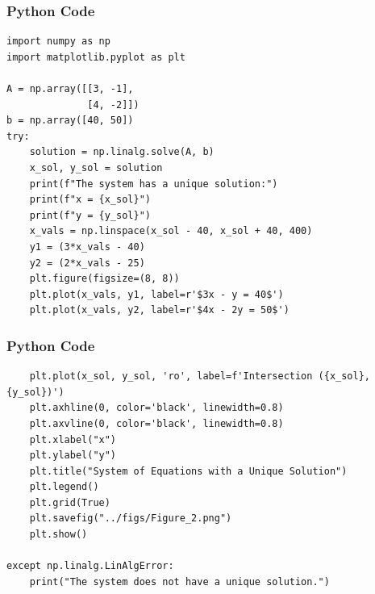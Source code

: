\documentclass{beamer}
\begin{document}
\begin{frame}[fragile]
    \frametitle{Python Code}
    \begin{lstlisting}
import numpy as np
import matplotlib.pyplot as plt

A = np.array([[3, -1],
              [4, -2]])
b = np.array([40, 50])
try:
    solution = np.linalg.solve(A, b)
    x_sol, y_sol = solution
    print(f"The system has a unique solution:")
    print(f"x = {x_sol}")
    print(f"y = {y_sol}")
    x_vals = np.linspace(x_sol - 40, x_sol + 40, 400)
    y1 = (3*x_vals - 40)
    y2 = (2*x_vals - 25)
    plt.figure(figsize=(8, 8))
    plt.plot(x_vals, y1, label=r'$3x - y = 40$')
    plt.plot(x_vals, y2, label=r'$4x - 2y = 50$')
    \end{lstlisting}
\end{frame}

\begin{frame}[fragile]
    \frametitle{Python Code}
    \begin{lstlisting}
    plt.plot(x_sol, y_sol, 'ro', label=f'Intersection ({x_sol}, {y_sol})')
    plt.axhline(0, color='black', linewidth=0.8)
    plt.axvline(0, color='black', linewidth=0.8)
    plt.xlabel("x")
    plt.ylabel("y")
    plt.title("System of Equations with a Unique Solution")
    plt.legend()
    plt.grid(True)
    plt.savefig("../figs/Figure_2.png")
    plt.show()

except np.linalg.LinAlgError:
    print("The system does not have a unique solution.")
    \end{lstlisting}
\end{frame}
\end{document}
